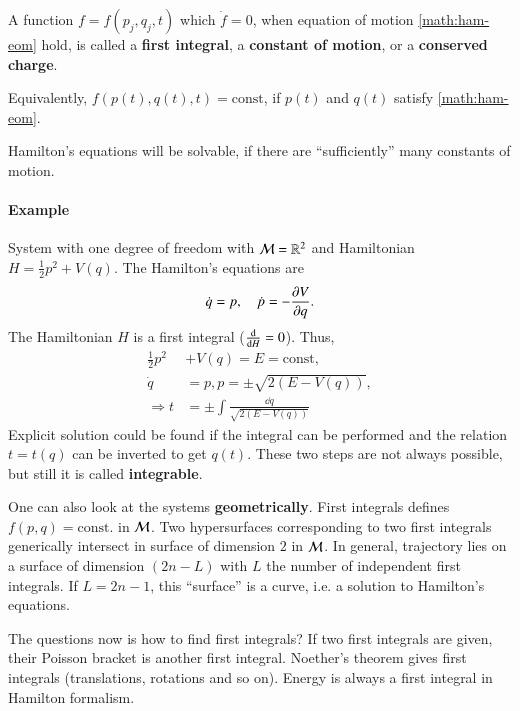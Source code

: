 \begin{definition}
	A function $f= f(p_j, q_j, t)$ which $\dot{f} = 0$, when equation of motion \eqref{math:ham-eom} hold, is called	a \textbf{first integral}, a \textbf{constant of motion}, or a \textbf{conserved charge}.
\end{definition}
Equivalently, $f(p(t), q(t), t) = \text{const}$, if $p(t)$ and $q(t)$ satisfy \eqref{math:ham-eom}.

Hamilton's equations will be solvable, if there are ``sufficiently'' many constants of motion.

\paragraph{Example}
	System with one degree of freedom with $\mathcal{M} = \mathbb{R}^2$ and Hamiltonian $H = \frac{1}{2} p^2 + V(q)$. The Hamilton's equations are
	\begin{equation*}
		\dot{q} = p, \quad \dot{p} = - \pdv{V}{q}	.
	\end{equation*}
	The Hamiltonian $H$ is a first integral	 ($\dv{H} = 0$). Thus,
	\begin{align*}
		\frac{1}{2} p^2 &+ V(q) = E = \text{const} , \\
		\dot{q} &= p, p = \pm \sqrt{2(E-V(q))} , \\
		\Rightarrow t &= \pm \int \frac{\dd{q}}{\sqrt{2(E-V(q))}}
	\end{align*}
	Explicit solution could be found if the integral can be performed and the relation $t=t(q)$ can be inverted to get $q(t)$. These two steps are not always possible, but still it is called \textbf{integrable}.

One can also look at the systems \textbf{geometrically}. First integrals defines $f(p, q)=\text{const.}$ in $\mathcal{M}$. Two hypersurfaces corresponding to two first integrals generically intersect in surface of dimension $2$ in $\mathcal{M}$. In general, trajectory lies on a surface of dimension $(2n-L)$ with $L$ the number of independent first integrals. If $L=2n-1$, this ``surface'' is a curve, i.e. a solution to Hamilton's equations.

The questions now is how to find first integrals? If two first integrals are given, their Poisson bracket is another first integral. Noether's theorem gives first integrals (translations, rotations and so on). Energy is always a first integral in Hamilton formalism.

